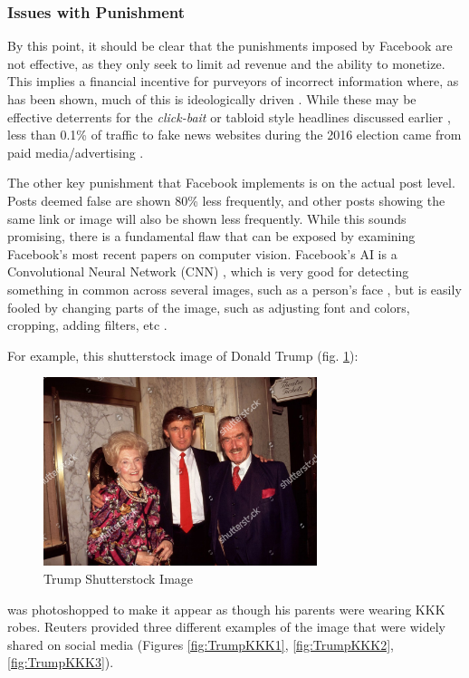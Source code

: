 \documentclass[preprint,review,12pt]{elsarticle}
\begin{document}
\subsubsection{Issues with Punishment}
\label{Issues with Punishment Section}
By this point, it should be clear that the punishments imposed by Facebook are not effective, as they only seek to limit ad revenue and the ability to monetize. This implies a financial incentive for purveyors of incorrect information where, as has been shown, much of this is ideologically driven \cite{allcott2017social}. While these may be effective deterrents for the \textit{click-bait} or tabloid style headlines discussed earlier  \cite{chen2015misleading}, less than 0.1\% of traffic to fake news websites during the 2016 election came from paid media/advertising \cite{albright2016election2016}. 

The other key punishment that Facebook implements is on the actual post level. Posts deemed false are shown 80\% less frequently, and other posts showing the same link or image will also be shown less frequently. While this sounds promising, there is a fundamental flaw that can be exposed by examining Facebook's most recent papers on computer vision. Facebook's AI is a Convolutional Neural Network (CNN) \cite{carion2020end}, which is very good for detecting something in common across several images, such as a person's face \cite{kalinovskii2015compact}, but is easily fooled by changing parts of the image, such as adjusting font and colors, cropping, adding filters, etc \cite{sumbaly2020using}.

For example, this shutterstock image of Donald Trump (fig. \ref{fig:Trump Shutterstock Image}): 
 \begin{figure}[htp]
    \centering
    \includegraphics[width=8cm]{trumpkkk0.jpg}
    \caption{Trump Shutterstock Image}
    \label{fig:Trump Shutterstock Image}
\end{figure}

was photoshopped to make it appear as though his parents were wearing KKK robes. Reuters provided three different examples of the image that were widely shared on social media \cite{reuters2020trump} (Figures \ref{fig:TrumpKKK1}, \ref{fig:TrumpKKK2}, \ref{fig:TrumpKKK3}).
\end{document}
